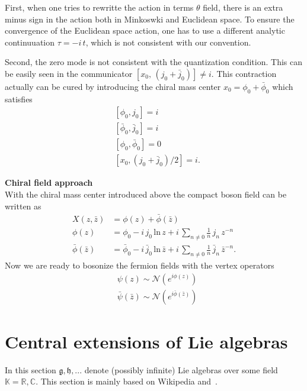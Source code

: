 \documentclass[submission, PhysLectNotes]{SciPost}
\begin{document}
First, when one tries to rewritte the action in terms $\theta$ field, there is an extra minus sign in the action both in Minkoswki and Euclidean space. To ensure the convergence of the Euclidean space action, one has to use a different analytic continuuation $\tau = -i\,t$, which is not consistent with our convention.

Second, the zero mode is not consistent with the quantization condition. This can be easily seen in the communicator $\left[x_0,\,\left(j_0+\bar{j}_0\right)\right] \neq i$. This contraction actually can be cured by introducing the chiral mass center $x_0 = \phi_0 + \bar{\phi}_0$ which satisfies
\begin{equation}
	\begin{split}
		&\left[\phi_0,j_0\right] = i\\
		&\left[\bar{\phi}_0,\bar{j}_0\right] = i\\
		&\left[\phi_0,\bar{\phi}_0\right] = 0 \\
		&\left[x_0,\left(j_0+\bar{j}_0\right)/2\right] = i.
	\end{split}
\end{equation}

{\bf Chiral field approach}\\
With the chiral mass center introduced above the compact boson field can be written as 
\begin{equation}
	\begin{split}
		X(z,\bar{z}) &= \phi(z) + \bar{\phi}(\bar{z}) \\
		\phi(z) &= \phi_0 -i\,j_0\,\mathrm{ln}\,z + i\,\sum_{n\neq0} \frac{1}{n}\,j_n\,z^{-n} \\
		\bar{\phi}(\bar{z}) &= \bar{\phi}_0 -i\,\bar{j}_0\,\mathrm{ln}\,\bar{z} + i\,\sum_{n\neq0} \frac{1}{n}\,\bar{j}_n\,\bar{z}^{-n}.
	\end{split}
\end{equation} 
Now we are ready to bosonize the fermion fields with the vertex operators
\begin{equation}
	\begin{split}
		&\psi(z) \sim \mathcal{N}\left(e^{i\phi(z)}\right) \\
		&\bar{\psi}(\bar{z}) \sim \mathcal{N}\left(e^{i\bar{\phi}(\bar{z})}\right)
	\end{split}
\end{equation}


\fi
\appendix

\section{Central extensions of Lie algebras}
In this section $\mathfrak{g},\mathfrak{h},...$ denote (possibly infinite) Lie algebras over some field $\mathbb{K} = \mathbb{R}, \mathbb{C}$. This section is mainly based on Wikipedia and~\cite{Schottenloher}.
\end{document}
